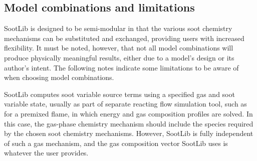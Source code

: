 \documentclass[preprint,letterpaper]{elsarticle}
\begin{document}

\subsection{Model combinations and limitations}
\label{s:limitations}

SootLib is designed to be semi-modular in that the various soot chemistry mechanisms can be substituted and exchanged, providing users with increased flexibility. It must be noted, however, that not all model combinations will produce physically meaningful results, either due to a model's design or its author's intent. The following notes indicate some limitations to be aware of when choosing model combinations.

SootLib computes soot variable source terms using a specified gas and soot variable state, usually as part of separate reacting flow simulation tool, such as for a premixed flame, in which energy and gas composition profiles are solved. In this case, the gas-phase chemistry mechanism should include the species required by the chosen soot chemistry mechanisms. However, SootLib is fully independent of such a gas mechanism, and the gas composition vector SootLib uses is whatever the user provides.  
\end{document}
